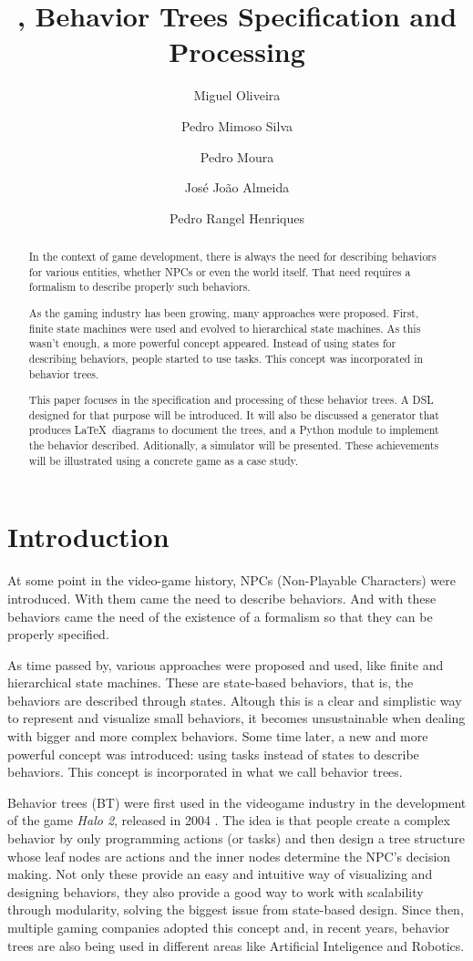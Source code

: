 \documentclass[a4paper,UKenglish,cleveref, autoref, thm-restate]{oasics-v2019}
\title{\bht, Behavior Trees Specification and Processing} %
\author{Miguel Oliveira}{Centro ALGORITMI, DI, Universidade do Minho, Portugal}{}{}{}
\author{Pedro Mimoso Silva}{Centro ALGORITMI, DI, Universidade do Minho, Portugal}{}{}{}
\author{Pedro Moura}{Centro ALGORITMI, DI, Universidade do Minho, Portugal}{}{}{}
\author{José João Almeida}{Centro ALGORITMI, DI, Universidade do Minho, Portugal}{}{}{}
\author{Pedro Rangel Henriques}{Centro ALGORITMI, DI, Universidade do Minho, Portugal}{}{}{}
\begin{document}
\maketitle

\begin{abstract}
In the context of game development, there is always the need for describing behaviors for various entities, whether NPCs or even the world itself.
That need requires a formalism to describe properly such behaviors.

As the gaming industry has been growing, many approaches were proposed.
First, finite state machines were used and evolved to hierarchical state machines.
As this wasn't enough, a more powerful concept appeared.
Instead of using states for describing behaviors, people started to use tasks.
This concept was incorporated in behavior trees.

This paper focuses in the specification and processing of these behavior trees.
A DSL designed for that purpose will be introduced.
It will also be discussed a generator that produces \LaTeX\ diagrams to document the trees, and a Python module to implement the behavior described.
Aditionally, a simulator will be presented. 
These achievements will be illustrated using a concrete game as a case study.
\end{abstract}


\section{Introduction}
\label{sec:introduction}

At some point in the video-game history, NPCs (Non-Playable Characters) were introduced. 
With them came the need to describe behaviors.
And with these behaviors came the need of the existence of a formalism so that they can be properly specified.

As time passed by, various approaches were proposed and used, like finite and hierarchical state machines.
These are state-based behaviors, that is, the behaviors are described through states.
Altough this is a clear and simplistic way to represent and visualize small behaviors, it becomes unsustainable when dealing with bigger and more complex behaviors.
Some time later, a new and more powerful concept was introduced: using tasks instead of states to describe behaviors.
This concept is incorporated in what we call behavior trees.

Behavior trees (BT) were first used in the videogame industry in the development of the game \textit{Halo 2}, released in 2004 \cite{Cuadrado2018,ColOgr2018}.
The idea is that people create a complex behavior by only programming actions (or tasks) and then design a tree structure whose leaf nodes are actions and the inner nodes determine the NPC's decision making.
Not only these provide an easy and intuitive way of visualizing and designing behaviors, they also provide a good way to work with scalability through modularity, solving the biggest issue from state-based design.
Since then, multiple gaming companies adopted this concept and, in recent years, behavior trees are also being used in different areas like Artificial Inteligence and Robotics.
\end{document}
